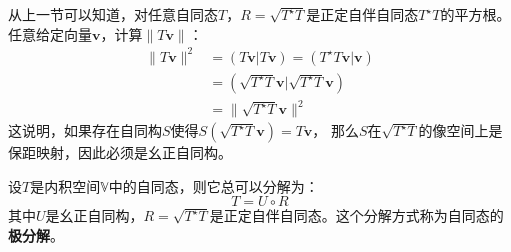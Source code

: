 \documentclass[12pt,UTF8,fontset=none]{ctexbook}
\begin{document}
从上一节可以知道，对任意自同态$T$，$R = \sqrt{T^\star T}$是正定自伴自同态$T^\star T$的平方根。
任意给定向量$\mathbf{v}$，计算$\|T\mathbf{v}\|$：
\begin{align*}
    \|T\mathbf{v}\|^2 &= (T\mathbf{v} | T\mathbf{v}) = (T^\star T\mathbf{v} | \mathbf{v})  \\
    &= (\sqrt{T^\star T}\mathbf{v} | \sqrt{T^\star T}\mathbf{v})  \\
    &= \| \sqrt{T^\star T} \mathbf{v}\|^2 
\end{align*}
这说明，如果存在自同构$S$使得$S(\sqrt{T^\star T} \mathbf{v}) = T\mathbf{v}$，
那么$S$在$\sqrt{T^\star T}$的像空间上是保距映射，因此必须是幺正自同构。
\begin{pp}\label{pp:8_14}
    设$T$是内积空间$\mathbb{V}$中的自同态，则它总可以分解为：
    $$ T = U \circ R$$
    其中$U$是幺正自同构，$R = \sqrt{T^\star T}$是正定自伴自同态。这个分解方式称为自同态的\textbf{极分解}。
\end{pp}
\end{document}

